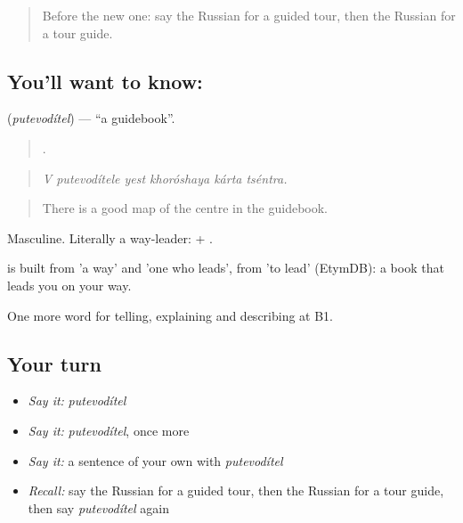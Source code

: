 \label{lesson:RU-C442-putevoditel}



\begin{quote}
Before the new one: say the Russian for a guided tour, then the Russian for a tour guide.
\end{quote}

\subsection*{You'll want to know: }
\textbf{} (\emph{putevodítel}) — \textquotedblleft{}a guidebook\textquotedblright{}.

\begin{quote}
     .
\end{quote}

\begin{quote}
\emph{V putevodítele yest khoróshaya kárta tséntra.}
\end{quote}

\begin{quote}
There is a good map of the centre in the guidebook.
\end{quote}

Masculine. Literally a way-leader: \emph{} + \emph{}.

\begin{cousinweb}
\emph{} is built from \emph{} 'a way' and \emph{} 'one who leads', from \emph{} 'to lead' (EtymDB): a book that leads you on your way.
\end{cousinweb}

\begin{grammarlens}[title={What you've built}]
One more word for telling, explaining and describing at B1.
\end{grammarlens}

\subsection*{Your turn}
\begin{itemize}
\raggedright
  \item \emph{Say it:} \emph{putevodítel}
  \item \emph{Say it:} \emph{putevodítel}, once more
  \item \emph{Say it:} a sentence of your own with \emph{putevodítel}
  \item \emph{Recall:} say the Russian for a guided tour, then the Russian for a tour guide, then say \emph{putevodítel} again
\end{itemize}

